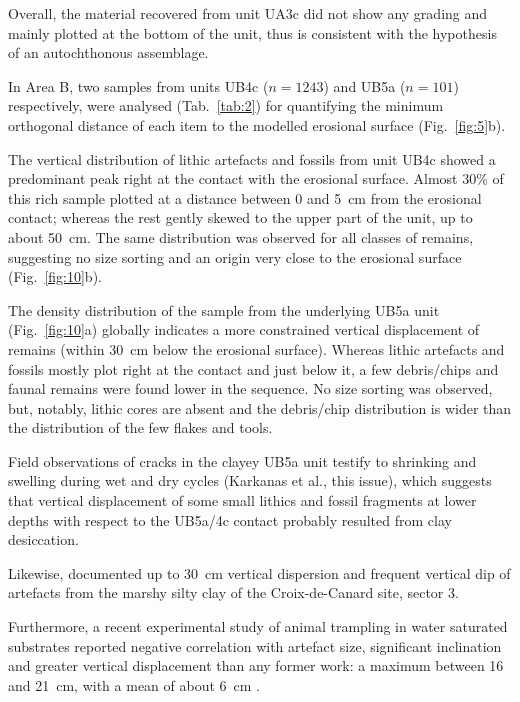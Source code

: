 \documentclass[preprint,authoryear,times]{elsarticle} %
\begin{document}
Overall, the material recovered from unit UA3c did not show any grading and mainly plotted at the bottom of the unit, thus is consistent with the hypothesis of an autochthonous assemblage.


In Area B, two samples from units UB4c ($n = 1243$) and UB5a ($n = 101$) respectively, were analysed (Tab.~\ref{tab:2}) for quantifying the minimum orthogonal distance of each item to the modelled erosional surface (Fig.~\ref{fig:5}b).

The vertical distribution of lithic artefacts and fossils from unit UB4c showed a predominant peak right at the contact with the erosional surface. Almost 30\% of this rich sample plotted at a distance between 0 and 5~cm from the erosional contact; whereas the rest gently skewed to the upper part of the unit, up to about 50~cm. The same distribution was observed for all classes of remains, suggesting no size sorting and an origin very close to the erosional surface (Fig.~\ref{fig:10}b).

The density distribution of the sample from the underlying UB5a unit (Fig.~\ref{fig:10}a) globally indicates a more constrained vertical displacement of remains (within 30~cm below the erosional surface). Whereas lithic artefacts and fossils mostly plot right at the contact and just below it, a few debris/chips and faunal remains were found lower in the sequence. No size sorting was observed, but, notably, lithic cores are absent and the debris/chip distribution is wider than the distribution of the few flakes and tools.

Field observations of cracks in the clayey UB5a unit testify to shrinking and swelling during wet and dry cycles (Karkanas et al., this issue), which suggests that vertical displacement of some small lithics and fossil fragments at lower depths with respect to the UB5a/4c contact probably resulted from clay desiccation.

Likewise, \cite{Lenoble2004} documented up to 30~cm vertical dispersion and frequent vertical dip of artefacts from the marshy silty clay of the Croix-de-Canard site, sector 3.

Furthermore, a recent experimental study of animal trampling in water saturated substrates reported negative correlation with artefact size, significant inclination and greater vertical displacement than any former work: a maximum between 16 and 21~cm, with a mean of about 6~cm \citep{Eren2010}.
\end{document}
